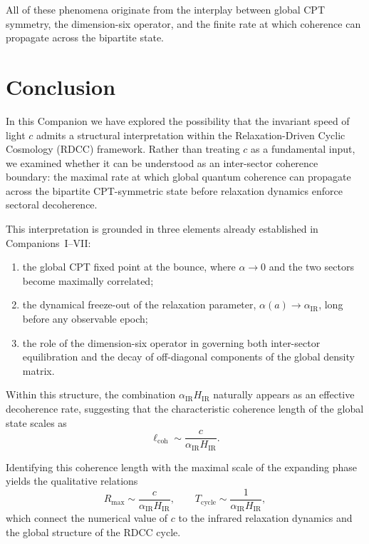 \documentclass[11pt,a4paper]{article}
\begin{document}
All of these phenomena originate from the interplay between global CPT symmetry, the
dimension-six operator, and the finite rate at which coherence can propagate across the
bipartite state.

\section{Conclusion}

In this Companion we have explored the possibility that the invariant speed of light $c$
admits a structural interpretation within the Relaxation-Driven Cyclic Cosmology (RDCC)
framework. Rather than treating $c$ as a fundamental input, we examined whether it can be
understood as an inter-sector coherence boundary: the maximal rate at which global quantum
coherence can propagate across the bipartite CPT-symmetric state before relaxation dynamics
enforce sectoral decoherence.

This interpretation is grounded in three elements already established in Companions~I–VII:
\begin{enumerate}
    \item the global CPT fixed point at the bounce, where $\alpha \rightarrow 0$ and the two
    sectors become maximally correlated;
    \item the dynamical freeze-out of the relaxation parameter, $\alpha(a) \rightarrow
    \alpha_{\mathrm{IR}}$, long before any observable epoch;
    \item the role of the dimension-six operator in governing both inter-sector equilibration
    and the decay of off-diagonal components of the global density matrix.
\end{enumerate}

Within this structure, the combination $\alpha_{\mathrm{IR}} H_{\mathrm{IR}}$ naturally appears as an
effective decoherence rate, suggesting that the characteristic coherence length of the global
state scales as
\begin{equation}
    \ell_{\mathrm{coh}} \sim \frac{c}{\alpha_{\mathrm{IR}} H_{\mathrm{IR}}}.
\end{equation}

Identifying this coherence length with the maximal scale of the expanding phase yields the
qualitative relations
\begin{equation}
    R_{\mathrm{max}} \sim \frac{c}{\alpha_{\mathrm{IR}} H_{\mathrm{IR}}}, 
    \qquad
    T_{\mathrm{cycle}} \sim \frac{1}{\alpha_{\mathrm{IR}} H_{\mathrm{IR}}},
\end{equation}
which connect the numerical value of $c$ to the infrared relaxation dynamics and the global
structure of the RDCC cycle.
\end{document}
